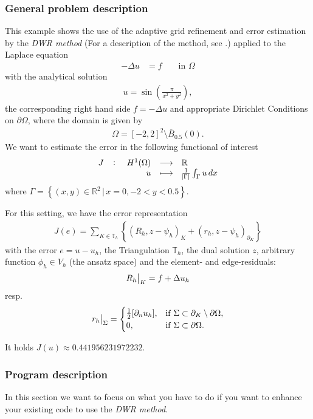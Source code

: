 \subsubsection{General problem description}
This example shows the use of the adaptive grid refinement and error estimation by the \textit{DWR method} (For a description of the method, see \cite{BR03}.) applied to the Laplace equation 
\begin{align*}
-\Delta u &= f && \text{ in } \Omega
\end{align*}
with the analytical solution
\begin{align*}
u = \sin\left(\frac{\pi}{x^2 + y^2}\right),
\end{align*}
 the corresponding right hand side $f = -\Delta u$ and appropriate Dirichlet Conditions on $\partial \Omega$, where the domain is given by
\begin{align*}
\Omega = [-2,2]^2\setminus \overline{B}_{0.5}(0).
\end{align*}
We want to estimate the error in the following functional of interest
$$\fullfunction{J}{H^1(\Omega)}{\mathbb{R}}{u}{\frac 1 {\abs{\Gamma}} \int_\Gamma u \,dx}$$
where
$\Gamma = \left\{(x,y)\in \mathbb R ^2\,\big | \,x=0,-2<y<0.5 \right \}$.

For this setting, we have the error representation
\begin{align}\label{dwr.error_identity}
J(e)=\sum_{K\in \mathbb T _h} \left\{(R_h, z-\psi_h)_K + (r_h, z-\psi_h)_{\partial_K}\right\}
\end{align}
with the error $e=u-u_h$, the Triangulation $\mathbb T_h$, the dual solution $z$, arbitrary function $\phi_h \in V_h$ (the ansatz space) and the element- and edge-residuals: 
\begin{align}\label{dwr.element_residual}
\eval[1]{R_h}_{K} = f+\Delta u_h
\end{align}
resp. 
\begin{align}\label{dwr.edge_residual}
\eval[1]{r_h}_{\Sigma} =
\begin{cases}
\frac 12 [\partial_n u_h] ,&\text{if } \Sigma \subset \partial_K \setminus \partial \Omega,\\
0,& \text{if } \Sigma \subset\partial \Omega.
\end{cases}
\end{align}

It holds $J(u) \approx 0.441956231972232$.
\subsubsection{Program description}
In this section we want to focus on what you have to do if you want to enhance your existing code to use the \textit{DWR method}.


